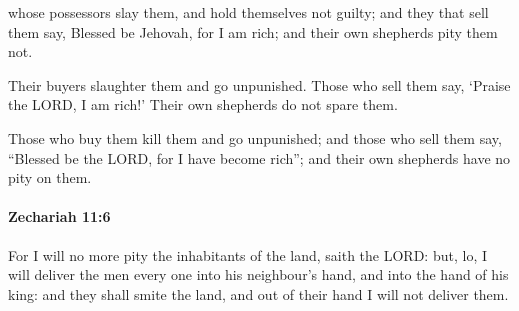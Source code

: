 			\begin{versebox}
					\item[BHS] 
					\item[LXX] 
					\item[ASV] whose possessors slay them, and hold themselves not guilty; and they that sell them say, Blessed be Jehovah, for I am rich; and their own shepherds pity them not.
					\item[NIV] Their buyers slaughter them and go unpunished. Those who sell them say, ‘Praise the LORD, I am rich!’ Their own shepherds do not spare them.
					\item[NRSV] Those who buy them kill them and go unpunished; and those who sell them say, “Blessed be the LORD, for I have become rich”; and their own shepherds have no pity on them.
			\end{versebox}

		\paragraph{Zechariah 11:6} %
			\label{ZECHARIAH-11-6}

			For I will no more pity the inhabitants of the land, saith the LORD: but, lo, I will deliver the men every one into his neighbour’s hand, and into the hand of his king: and they shall smite the land, and out of their hand I will not deliver them.

